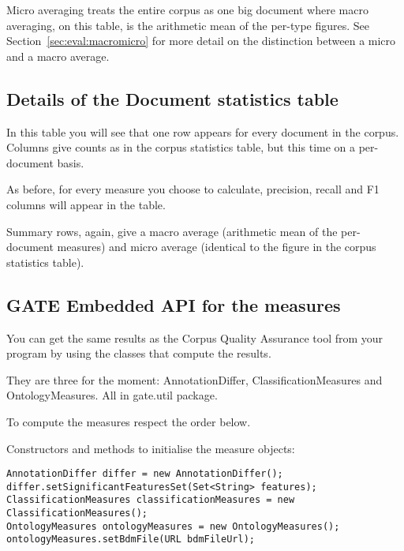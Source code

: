 Micro averaging treats the entire corpus as one big document where macro
averaging, on this table, is the arithmetic mean of the per-type figures. See
Section~\ref{sec:eval:macromicro} for more detail on the distinction between a
micro and a macro average.

\subsection{Details of the Document statistics table}

In this table you will see that one row appears for
every document in the corpus. Columns give counts as in the corpus statistics
table, but this time on a per-document basis.

As before, for every measure you
choose to calculate, precision, recall and F1 columns will appear in the table.

Summary rows, again, give a macro average (arithmetic mean of the per-document
measures) and micro average (identical to the figure in the corpus
statistics table).

\subsection{GATE Embedded API for the measures}

You can get the same results as the Corpus Quality Assurance tool from your
program by using the classes that compute the results.

They are three for the moment:
{AnnotationDiffer},
{ClassificationMeasures} and
{OntologyMeasures}. All in gate.util package.

To compute the measures respect the order below.

Constructors and methods to initialise the measure objects:
\begin{small}\begin{verbatim}
AnnotationDiffer differ = new AnnotationDiffer();
differ.setSignificantFeaturesSet(Set<String> features);
ClassificationMeasures classificationMeasures = new ClassificationMeasures();
OntologyMeasures ontologyMeasures = new OntologyMeasures();
ontologyMeasures.setBdmFile(URL bdmFileUrl);
\end{verbatim}\end{small}

